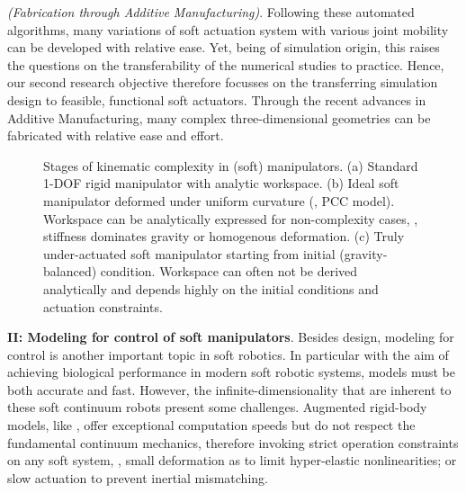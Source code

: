 \textit{(Fabrication through Additive Manufacturing)}. Following these automated algorithms, many variations of soft actuation system with various joint mobility can be developed with relative ease. Yet, being of simulation origin, this raises the questions on the transferability of the numerical studies to practice. Hence, our second research objective therefore focusses on the transferring simulation design to feasible, functional soft actuators. Through the recent advances in Additive Manufacturing, many complex three-dimensional geometries can be fabricated with relative ease and effort. 


\begin{figure}[!t]
  \vspace{-5mm}
  \ifx\printFigures\undefined
  \else
  \centering
  \hspace{-2mm}
  
  \fi
  \vspace{-4mm}
  \caption{Stages of kinematic complexity in (soft) manipulators. (a) Standard 1-DOF rigid manipulator with analytic workspace. (b) Ideal soft manipulator deformed under uniform curvature (\ie, PCC model). Workspace can be analytically expressed for non-complexity cases, \eg, stiffness dominates gravity or homogenous deformation. (c) Truly under-actuated soft manipulator starting from initial (gravity-balanced) condition. Workspace can often not be derived analytically and depends highly on the initial conditions and actuation constraints.}
  \label{fig:C0:contribTwo}
\end{figure}

\noindent \textbf{II: Modeling for control of soft manipulators}. Besides design, modeling for control is another important topic in soft robotics. In particular with the aim of achieving biological performance in modern soft robotic systems, models must be both accurate and fast. However, the infinite-dimensionality that are inherent to these soft continuum robots present some challenges. Augmented rigid-body models, like \cite{Katzschmann2019,Milana2021Apr,Franco2020}, offer exceptional computation speeds but do not respect the fundamental continuum mechanics, therefore invoking strict operation constraints on any soft system, \ie, small deformation as to limit hyper-elastic nonlinearities; or slow actuation to prevent inertial mismatching. 

